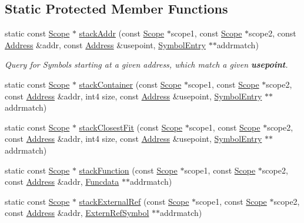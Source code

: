 \subsection*{Static Protected Member Functions}
\begin{DoxyCompactItemize}
\item 
static const \mbox{\hyperlink{class_scope}{Scope}} $\ast$ \mbox{\hyperlink{class_scope_a598536926659c304d35346aba6d79fa2}{stack\+Addr}} (const \mbox{\hyperlink{class_scope}{Scope}} $\ast$scope1, const \mbox{\hyperlink{class_scope}{Scope}} $\ast$scope2, const \mbox{\hyperlink{class_address}{Address}} \&addr, const \mbox{\hyperlink{class_address}{Address}} \&usepoint, \mbox{\hyperlink{class_symbol_entry}{Symbol\+Entry}} $\ast$$\ast$addrmatch)
\begin{DoxyCompactList}\small\item\em Query for Symbols starting at a given address, which match a given {\bfseries{usepoint}}. \end{DoxyCompactList}\item 
static const \mbox{\hyperlink{class_scope}{Scope}} $\ast$ \mbox{\hyperlink{class_scope_a63e00dad81427a8595cf7bf13d8e1e0d}{stack\+Container}} (const \mbox{\hyperlink{class_scope}{Scope}} $\ast$scope1, const \mbox{\hyperlink{class_scope}{Scope}} $\ast$scope2, const \mbox{\hyperlink{class_address}{Address}} \&addr, int4 size, const \mbox{\hyperlink{class_address}{Address}} \&usepoint, \mbox{\hyperlink{class_symbol_entry}{Symbol\+Entry}} $\ast$$\ast$addrmatch)
\item 
static const \mbox{\hyperlink{class_scope}{Scope}} $\ast$ \mbox{\hyperlink{class_scope_a4de9b51d8c57e33e9394512489539664}{stack\+Closest\+Fit}} (const \mbox{\hyperlink{class_scope}{Scope}} $\ast$scope1, const \mbox{\hyperlink{class_scope}{Scope}} $\ast$scope2, const \mbox{\hyperlink{class_address}{Address}} \&addr, int4 size, const \mbox{\hyperlink{class_address}{Address}} \&usepoint, \mbox{\hyperlink{class_symbol_entry}{Symbol\+Entry}} $\ast$$\ast$addrmatch)
\item 
static const \mbox{\hyperlink{class_scope}{Scope}} $\ast$ \mbox{\hyperlink{class_scope_a1e0d2e90ee5d4bc7e3dc761390be5e47}{stack\+Function}} (const \mbox{\hyperlink{class_scope}{Scope}} $\ast$scope1, const \mbox{\hyperlink{class_scope}{Scope}} $\ast$scope2, const \mbox{\hyperlink{class_address}{Address}} \&addr, \mbox{\hyperlink{class_funcdata}{Funcdata}} $\ast$$\ast$addrmatch)
\item 
static const \mbox{\hyperlink{class_scope}{Scope}} $\ast$ \mbox{\hyperlink{class_scope_a44898a2294de74a77dd21583ca6254e2}{stack\+External\+Ref}} (const \mbox{\hyperlink{class_scope}{Scope}} $\ast$scope1, const \mbox{\hyperlink{class_scope}{Scope}} $\ast$scope2, const \mbox{\hyperlink{class_address}{Address}} \&addr, \mbox{\hyperlink{class_extern_ref_symbol}{Extern\+Ref\+Symbol}} $\ast$$\ast$addrmatch)
$$
\end{DoxyCompactItemize}
